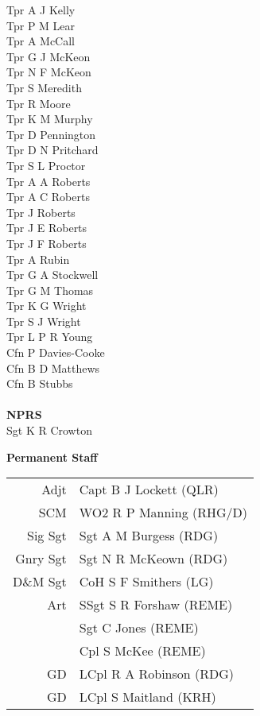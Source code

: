 \begin{multicols}{2}
  Tpr A J Kelly \\
  Tpr P M Lear \\
  Tpr A McCall \\
  Tpr G J McKeon \\
  Tpr N F McKeon \\
  Tpr S Meredith \\
  Tpr R Moore \\
  Tpr K M Murphy \\
  Tpr D Pennington \\
  Tpr D N Pritchard \\
  Tpr S L Proctor \\
  Tpr A A Roberts \\
  Tpr A C Roberts \\
  Tpr J Roberts \\
  Tpr J E Roberts \\
  Tpr J F Roberts \\
  Tpr A Rubin \\
  Tpr G A Stockwell \\
  Tpr G M Thomas \\
  Tpr K G Wright \\
  Tpr S J Wright \\
  Tpr L P R Young \\
  Cfn P Davies-Cooke \\
  Cfn B D Matthews \\
  Cfn B Stubbs \\
  \\
  \textbf{NPRS} \\
  Sgt K R Crowton \\
\end{multicols}

\begin{center}
  \Large
  \textbf{Permanent Staff}
\end{center}

\begin{center}
  \begin{tabular}{rl}
    Adjt & Capt B J Lockett (QLR) \\
    SCM & WO2 R P Manning (RHG/D) \\
    Sig Sgt & Sgt A M Burgess (RDG) \\
    Gnry Sgt & Sgt N R McKeown (RDG) \\
     D\&M Sgt & CoH S F Smithers (LG) \\
    Art & SSgt S R Forshaw (REME) \\
    & Sgt C Jones (REME) \\
    & Cpl S McKee (REME) \\
    GD & LCpl R A Robinson (RDG) \\
    GD & LCpl S Maitland (KRH) \\
  \end{tabular}
\end{center}

